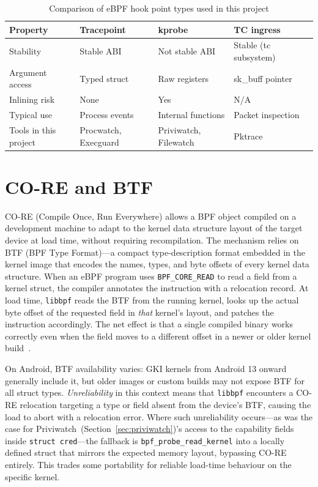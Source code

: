 \documentclass{mnitjaipur}
\begin{document}
\begin{table}[H]
  \centering
  \caption{Comparison of eBPF hook point types used in this project}
  \label{tab:hookpoint-comparison}
  \begin{tabular}{|p{}|p{}|p{}|p{}|p{}|}
    \hline
    \textbf{Property} & \textbf{Tracepoint} & \textbf{kprobe} & \textbf{TC ingress} \\ \hline
    Stability & Stable ABI & Not stable ABI & Stable (tc subsystem) \\ \hline
    Argument access & Typed struct & Raw registers & sk\_buff pointer \\ \hline
    Inlining risk & None & Yes & N/A \\ \hline
    Typical use & Process events & Internal functions & Packet inspection \\ \hline
    Tools in this project & Procwatch, Execguard & Priviwatch, Filewatch & Pktrace \\ \hline
  \end{tabular}
\end{table}

\section{CO-RE and BTF}
CO-RE (Compile Once, Run Everywhere) allows a BPF object compiled on a development machine to adapt to the kernel data structure layout of the target device at load time, without requiring recompilation. The mechanism relies on BTF (BPF Type Format)---a compact type-description format embedded in the kernel image that encodes the names, types, and byte offsets of every kernel data structure. When an eBPF program uses \texttt{BPF\_CORE\_READ} to read a field from a kernel struct, the compiler annotates the instruction with a relocation record. At load time, \texttt{libbpf} reads the BTF from the running kernel, looks up the actual byte offset of the requested field in \emph{that} kernel's layout, and patches the instruction accordingly. The net effect is that a single compiled binary works correctly even when the field moves to a different offset in a newer or older kernel build~\cite{libbpf_doc}.

On Android, BTF availability varies: GKI kernels from Android 13 onward generally include it, but older images or custom builds may not expose BTF for all struct types. \emph{Unreliability} in this context means that \texttt{libbpf} encounters a CO-RE relocation targeting a type or field absent from the device's BTF, causing the load to abort with a relocation error. Where such unreliability occurs---as was the case for Priviwatch~(Section~\ref{sec:priviwatch})'s access to the capability fields inside \texttt{struct cred}---the fallback is \texttt{bpf\_probe\_read\_kernel} into a locally defined struct that mirrors the expected memory layout, bypassing CO-RE entirely. This trades some portability for reliable load-time behaviour on the specific kernel.
\end{document}
